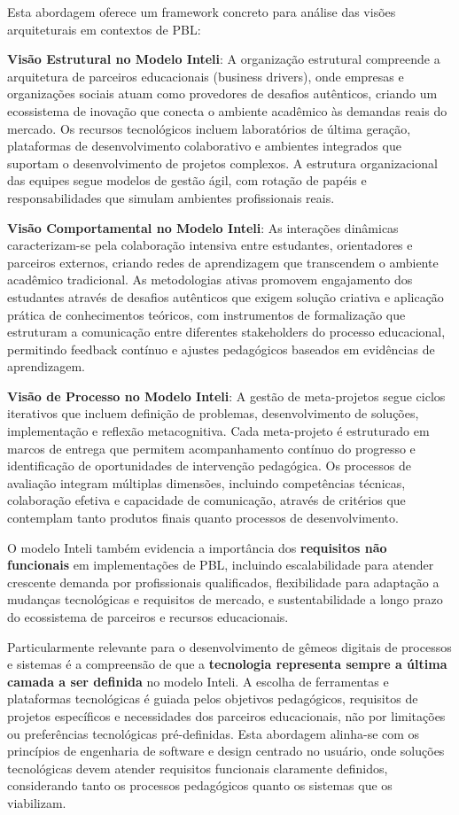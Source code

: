 \documentclass[12pt, a4paper, oneside]{abntex2}
\begin{document}
Esta abordagem oferece um framework concreto para análise das visões arquiteturais em contextos de PBL:

\textbf{Visão Estrutural no Modelo Inteli}: A organização estrutural compreende a arquitetura de parceiros educacionais (business drivers), onde empresas e organizações sociais atuam como provedores de desafios autênticos, criando um ecossistema de inovação que conecta o ambiente acadêmico às demandas reais do mercado. Os recursos tecnológicos incluem laboratórios de última geração, plataformas de desenvolvimento colaborativo e ambientes integrados que suportam o desenvolvimento de projetos complexos. A estrutura organizacional das equipes segue modelos de gestão ágil, com rotação de papéis e responsabilidades que simulam ambientes profissionais reais.

\textbf{Visão Comportamental no Modelo Inteli}: As interações dinâmicas caracterizam-se pela colaboração intensiva entre estudantes, orientadores e parceiros externos, criando redes de aprendizagem que transcendem o ambiente acadêmico tradicional. As metodologias ativas promovem engajamento dos estudantes através de desafios autênticos que exigem solução criativa e aplicação prática de conhecimentos teóricos, com instrumentos de formalização que estruturam a comunicação entre diferentes stakeholders do processo educacional, permitindo feedback contínuo e ajustes pedagógicos baseados em evidências de aprendizagem.

\textbf{Visão de Processo no Modelo Inteli}: A gestão de meta-projetos segue ciclos iterativos que incluem definição de problemas, desenvolvimento de soluções, implementação e reflexão metacognitiva. Cada meta-projeto é estruturado em marcos de entrega que permitem acompanhamento contínuo do progresso e identificação de oportunidades de intervenção pedagógica. Os processos de avaliação integram múltiplas dimensões, incluindo competências técnicas, colaboração efetiva e capacidade de comunicação, através de critérios que contemplam tanto produtos finais quanto processos de desenvolvimento.

O modelo Inteli também evidencia a importância dos \textbf{requisitos não funcionais} em implementações de PBL, incluindo escalabilidade para atender crescente demanda por profissionais qualificados, flexibilidade para adaptação a mudanças tecnológicas e requisitos de mercado, e sustentabilidade a longo prazo do ecossistema de parceiros e recursos educacionais.

Particularmente relevante para o desenvolvimento de gêmeos digitais de processos e sistemas é a compreensão de que a \textbf{tecnologia representa sempre a última camada a ser definida} no modelo Inteli. A escolha de ferramentas e plataformas tecnológicas é guiada pelos objetivos pedagógicos, requisitos de projetos específicos e necessidades dos parceiros educacionais, não por limitações ou preferências tecnológicas pré-definidas. Esta abordagem alinha-se com os princípios de engenharia de software e design centrado no usuário, onde soluções tecnológicas devem atender requisitos funcionais claramente definidos, considerando tanto os processos pedagógicos quanto os sistemas que os viabilizam.
\end{document}
